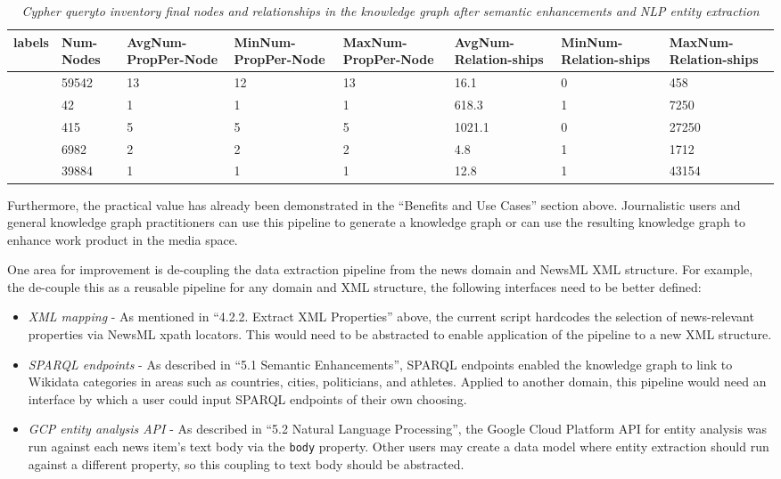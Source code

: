 \documentclass[11pt]{article}
\begin{document}
  \begin{table}
    \begin{tabular}{ |p{2cm}|p{1cm}|p{1.5cm}|p{1.5cm}|p{1.5cm}|p{1.5cm}|p{1.5cm}|p{1.5cm}| }
    \hline
    labels&Num-Nodes&AvgNum-PropPer-Node&MinNum-PropPer-Node&MaxNum-PropPer-Node&AvgNum-Relation-ships&MinNum-Relation-ships&MaxNum-Relation-ships\\
    \hline
    [``NewsItem'']&59542&13&12&13&16.1&0&458\\
    \hline
    [``Genre'']&42&1&1&1&618.3&1&7250\\
    \hline
    [``Subject'']&415&5&5&5&1021.1&0&27250\\
    \hline
    [``Resource'', ``Category'']&6982&2&2&2&4.8&1&1712\\
    \hline
    [``Resource'', ``WikipediaPage'']&39884&1&1&1&12.8&1&43154\\
    \hline
    \end{tabular}

    \caption{\textit{Cypher query\protect \footnotemark to inventory final nodes and relationships in the knowledge graph after semantic enhancements and NLP entity extraction}}
  \end{table}

  Furthermore, the practical value has already been demonstrated in the ``Benefits and Use Cases'' section above. Journalistic users and general knowledge graph practitioners can use this pipeline to generate a knowledge graph or can use the resulting knowledge graph to enhance work product in the media space.

  One area for improvement is de-coupling the data extraction pipeline from the news domain and NewsML XML structure. For example, the de-couple this as a reusable pipeline for any domain and XML structure, the following interfaces need to be better defined:
  \begin{itemize}
    \item{\textit{XML mapping} - As mentioned in ``4.2.2. Extract XML Properties'' above, the current script hardcodes the selection of news-relevant properties via NewsML xpath locators. This would need to be abstracted to enable application of the pipeline to a new XML structure.}
    \item{\textit{SPARQL endpoints} - As described in ``5.1 Semantic Enhancements'', SPARQL endpoints enabled the knowledge graph to link to Wikidata categories in areas such as countries, cities, politicians, and athletes. Applied to another domain, this pipeline would need an interface by which a user could input SPARQL endpoints of their own choosing.}
    \item{\textit{GCP entity analysis API} - As described in ``5.2 Natural Language Processing'', the Google Cloud Platform API for entity analysis was run against each news item's text body via the \lstinline{body} property. Other users may create a data model where entity extraction should run against a different property, so this coupling to text body should be abstracted.}
  \end{itemize}
\end{document}
